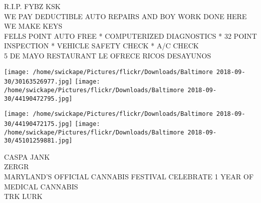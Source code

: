 \documentclass[10pt,letterpaper]{article}
\begin{document}
R.I.P. FYBZ KSK\\
WE PAY DEDUCTIBLE AUTO REPAIRS AND BOY WORK DONE HERE WE MAKE KEYS\\
FELLS POINT AUTO FREE * COMPUTERIZED DIAGNOSTICS * 32 POINT INSPECTION * VEHICLE SAFETY CHECK * A/C CHECK\\
5 DE MAYO RESTAURANT LE OFRECE RICOS DESAYUNOS\\
\pagebreak

\texttt{[image: /home/swickape/Pictures/flickr/Downloads/Baltimore 2018-09-30/30163526977.jpg]}
\texttt{[image: /home/swickape/Pictures/flickr/Downloads/Baltimore 2018-09-30/44190472795.jpg]}

\texttt{[image: /home/swickape/Pictures/flickr/Downloads/Baltimore 2018-09-30/44190472175.jpg]}
\texttt{[image: /home/swickape/Pictures/flickr/Downloads/Baltimore 2018-09-30/45101259881.jpg]}

CASPA JANK\\
ZERGR\\
MARYLAND'S OFFICIAL CANNABIS FESTIVAL CELEBRATE 1 YEAR OF MEDICAL CANNABIS\\
TRK LURK\\
\pagebreak
\end{document}
